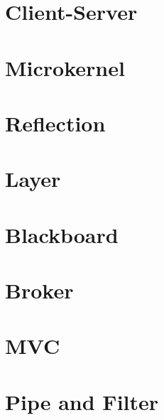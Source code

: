 \section{Client-Server}

\section{Microkernel}

\section{Reflection}

\section{Layer}

\section{Blackboard}

\section{Broker}

\section{MVC}

\section{Pipe and Filter}
